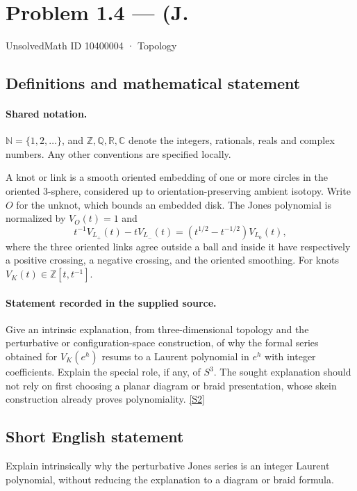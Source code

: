 \documentclass[11pt]{article}
\newcommand{\sref}[2]{\hyperlink{source:#1:#2}{[S#2]}}
\begin{document}
\setcounter{section}{10400003}
\section{Problem 1.4 — (J.}\label{10400004}
{\small\sffamily UnsolvedMath ID 10400004 · Topology}
\subsection{Definitions and mathematical statement}

\paragraph{Shared notation.}$\mathbb N=\{1,2,\ldots\}$, and $\mathbb Z,\mathbb Q,\mathbb R,\mathbb C$ denote the integers, rationals, reals and complex numbers. Any other conventions are specified locally.


A knot or link is a smooth oriented embedding of one or more circles in the oriented $3$-sphere, considered up to orientation-preserving ambient isotopy. Write $O$ for the unknot, which bounds an embedded disk. The Jones polynomial is normalized by $V_O(t)=1$ and
\[t^{-1}V_{L_+}(t)-tV_{L_-}(t)=(t^{1/2}-t^{-1/2})V_{L_0}(t),\]
where the three oriented links agree outside a ball and inside it have respectively a positive crossing, a negative crossing, and the oriented smoothing. For knots $V_K(t)\in\mathbb Z[t,t^{-1}]$.
\paragraph{Statement recorded in the supplied source.}
Give an intrinsic explanation, from three-dimensional topology and the perturbative or configuration-space construction, of why the formal series obtained for $V_K(e^h)$ resums to a Laurent polynomial in $e^h$ with integer coefficients. Explain the special role, if any, of $S^3$. The sought explanation should not rely on first choosing a planar diagram or braid presentation, whose skein construction already proves polynomiality. \sref{10400004}{2}
\subsection{Short English statement}
Explain intrinsically why the perturbative Jones series is an integer Laurent polynomial, without reducing the explanation to a diagram or braid formula.
\end{document}
